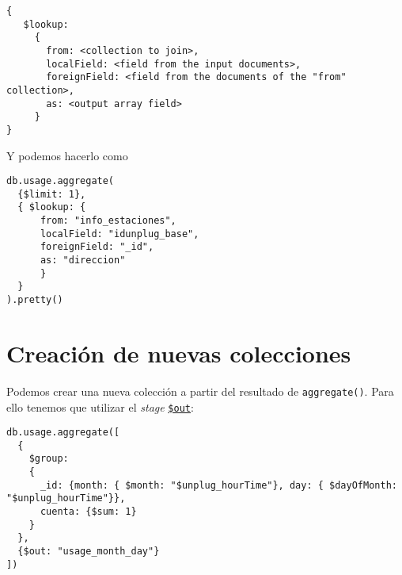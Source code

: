 \documentclass[]{article}
\begin{document}
\begin{verbatim}
{
   $lookup:
     {
       from: <collection to join>,
       localField: <field from the input documents>,
       foreignField: <field from the documents of the "from" collection>,
       as: <output array field>
     }
}
\end{verbatim}

Y podemos hacerlo como

\begin{verbatim}
db.usage.aggregate(
  {$limit: 1},
  { $lookup: {
      from: "info_estaciones",
      localField: "idunplug_base",
      foreignField: "_id",
      as: "direccion"
      }
  }
).pretty()
\end{verbatim}

\hypertarget{creacion-de-nuevas-colecciones}{%
\section{Creación de nuevas
colecciones}\label{creacion-de-nuevas-colecciones}}

Podemos crear una nueva colección a partir del resultado de
\texttt{aggregate()}. Para ello tenemos que utilizar el \emph{stage}
\href{https://docs.mongodb.com/manual/reference/operator/aggregation/out/}{\texttt{\$out}}:

\begin{verbatim}
db.usage.aggregate([
  {
    $group: 
    {
      _id: {month: { $month: "$unplug_hourTime"}, day: { $dayOfMonth: "$unplug_hourTime"}},
      cuenta: {$sum: 1}
    }
  },
  {$out: "usage_month_day"}
])
\end{verbatim}
\end{document}
